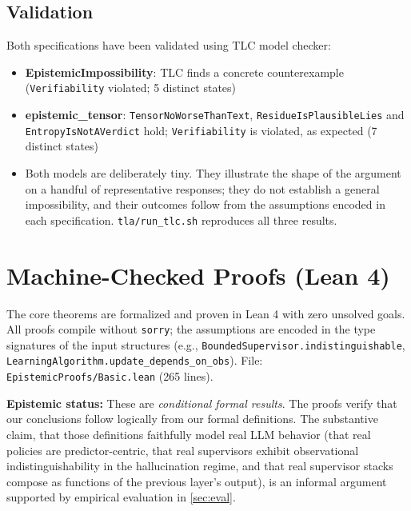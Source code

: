 \documentclass[11pt]{article}
\begin{document}
\subsection{Validation}

Both specifications have been validated using TLC model checker:
\begin{itemize}
    \item \textbf{EpistemicImpossibility}: TLC finds a concrete counterexample (\texttt{Verifiability} violated; 5 distinct states)
    \item \textbf{epistemic\_tensor}: \texttt{TensorNoWorseThanText}, \texttt{ResidueIsPlausibleLies} and \texttt{EntropyIsNotAVerdict} hold; \texttt{Verifiability} is violated, as expected (7 distinct states)
    \item Both models are deliberately tiny. They illustrate the shape of the argument on a handful of representative responses; they do not establish a general impossibility, and their outcomes follow from the assumptions encoded in each specification. \texttt{tla/run\_tlc.sh} reproduces all three results.
\end{itemize}

\section{Machine-Checked Proofs (Lean 4)}\label{app:lean}

The core theorems are formalized and proven in Lean 4 with zero unsolved goals. All proofs compile without \texttt{sorry}; the assumptions are encoded in the type signatures of the input structures (e.g., \texttt{BoundedSupervisor.indistinguishable}, \texttt{LearningAlgorithm.update\_depends\_on\_obs}). File: \texttt{EpistemicProofs/Basic.lean} (265 lines).

\textbf{Epistemic status:} These are \emph{conditional formal results}. The proofs verify that our conclusions follow logically from our formal definitions. The substantive claim, that those definitions faithfully model real LLM behavior (that real policies are predictor-centric, that real supervisors exhibit observational indistinguishability in the hallucination regime, and that real supervisor stacks compose as functions of the previous layer's output), is an informal argument supported by empirical evaluation in \autoref{sec:eval}.
\end{document}
